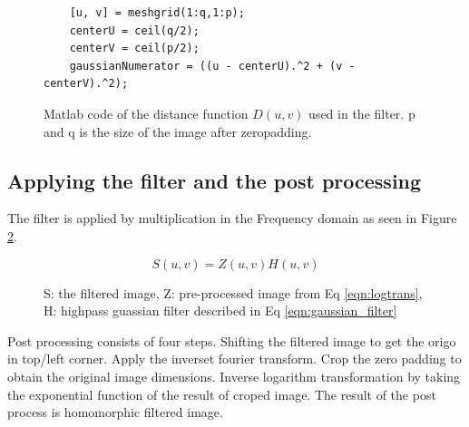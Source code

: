\begin{figure}[h!]
  \begin{lstlisting}
    [u, v] = meshgrid(1:q,1:p);
    centerU = ceil(q/2);
    centerV = ceil(p/2);
    gaussianNumerator = ((u - centerU).^2 + (v - centerV).^2);
  \end{lstlisting}
  \label{code:raduv}
  \caption{Matlab code of the distance function $D(u,v)$ used in the filter. p and q is the size of the image after zeropadding.}
\end{figure}

\subsection{Applying the filter and the post processing}

The filter is applied by multiplication in the Frequency domain as seen in Figure \ref{fig:filteringOfImage}. 
\begin{figure}[h!]
  \begin{equation}
    S(u,v) = Z(u,v)H(u,v)
    \label{eqn:applyfilt}
  \end{equation}
  \caption{S: the filtered image, Z: pre-processed image from Eq \ref{eqn:logtrans}, H: highpass guassian filter described in Eq \ref{eqn:gaussian_filter} }
  \label{fig:filteringOfImage}    
\end{figure}

Post processing consists of four steps. Shifting the filtered image to get the origo in top/left corner. Apply the inverset fourier transform. Crop the zero padding to obtain the original image dimensions. Inverse logarithm transformation by taking the exponential function of the result of croped image. The result of the post process is homomorphic filtered image.